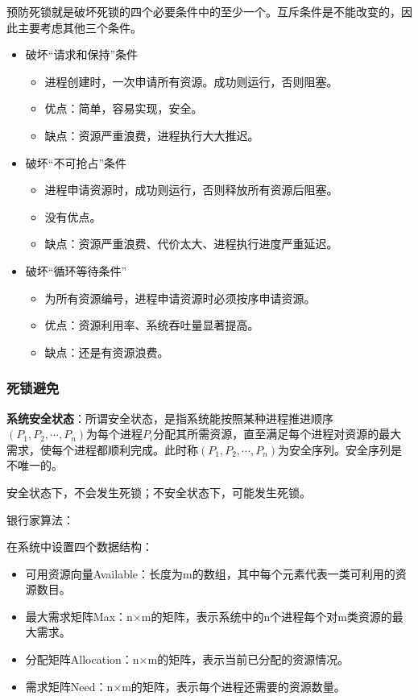 \documentclass[12pt, a4paper, oneside]{ctexart}
\begin{document}
预防死锁就是破坏死锁的四个必要条件中的至少一个。互斥条件是不能改变的，因此主要考虑其他三个条件。
\begin{itemize}
  \item 破坏“请求和保持”条件
  \begin{itemize}
    \item 进程创建时，一次申请所有资源。成功则运行，否则阻塞。
    \item 优点：简单，容易实现，安全。
    \item 缺点：资源严重浪费，进程执行大大推迟。
  \end{itemize}
  \item 破坏“不可抢占”条件
  \begin{itemize}
    \item 进程申请资源时，成功则运行，否则释放所有资源后阻塞。
    \item 没有优点。
    \item 缺点：资源严重浪费、代价太大、进程执行进度严重延迟。
  \end{itemize}
  \item 破坏“循环等待条件”
  \begin{itemize}
    \item 为所有资源编号，进程申请资源时必须按序申请资源。
    \item 优点：资源利用率、系统吞吐量显著提高。
    \item 缺点：还是有资源浪费。
  \end{itemize}
\end{itemize}

\subsubsection{死锁避免}

\textbf{系统安全状态}：所谓安全状态，是指系统能按照某种进程推进顺序$(P_1,P_2,\cdots,P_n)$为每个进程$P_i$分配其所需资源，直至满足每个进程对资源的最大需求，使每个进程都顺利完成。此时称$(P_1,P_2,\cdots,P_n)$为安全序列。安全序列是不唯一的。

安全状态下，不会发生死锁；不安全状态下，可能发生死锁。

\vspace*{10pt}

银行家算法：

在系统中设置四个数据结构：
\begin{itemize}
  \item 可用资源向量Available：长度为m的数组，其中每个元素代表一类可利用的资源数目。
  \item 最大需求矩阵Max：n$\times$m的矩阵，表示系统中的n个进程每个对m类资源的最大需求。
  \item 分配矩阵Allocation：n$\times$m的矩阵，表示当前已分配的资源情况。
  \item 需求矩阵Need：n$\times$m的矩阵，表示每个进程还需要的资源数量。
\end{itemize}
\end{document}
